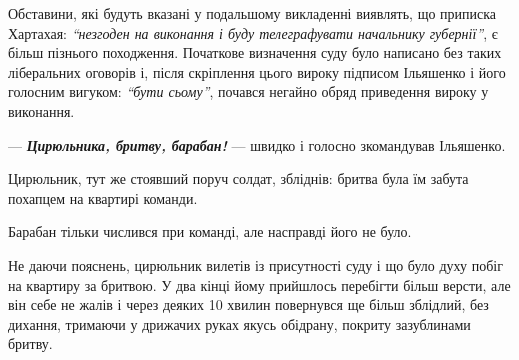 \documentclass[a4paper,20pt]{report}
\begin{document}
Обставини, які будуть вказані у подальшому викладенні 
виявлять, що приписка Хартахая: \emph{``незгоден на виконання і буду телеграфувати начальнику
губернії''}, є більш пізнього походження. Початкове визначення суду
було написано без таких ліберальних оговорів і, після
скріплення цього вироку підписом Ільяшенко і його голосним вигуком:
\emph{``бути сьому''}, почався негайно обряд приведення вироку у виконання.

— \textbf{\emph{Цирюльника, бритву, барабан!}} — швидко і голосно зкомандував Ільяшенко.

Цирюльник, тут же стоявший поруч солдат, збліднів: бритва була їм забута
похапцем на квартирі команди.

Барабан тільки числився при команді, але насправді його не було.

Не даючи пояснень, цирюльник вилетів із присутності суду і що було духу побіг
на квартиру за бритвою. У два кінці йому прийшлось перебігти більш версти, але
він себе не жалів і через деяких 10 хвилин повернувся ще більш зблідлий, без
дихання, тримаючи у дрижачих руках якусь обідрану, покриту зазублинами бритву.

\end{document}
